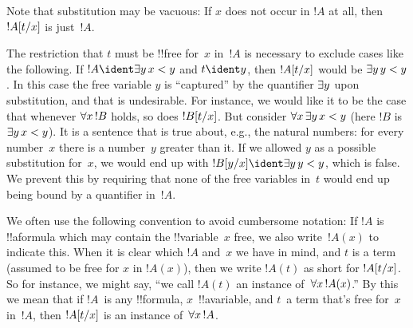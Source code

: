 \documentclass[../../../include/open-logic-section]{subfiles}
\begin{document}
\begin{explain}
Note that substitution may be vacuous: If $x$ does not occur in $!A$
at all, then $!A[t/x]$ is just~$!A$.

The restriction that $t$ must be !!{free for}~$x$ in~$!A$ is necessary to
exclude cases like the following. If $!A \ident \lexists[y][x < y]$
and $t \ident y$, then $!A[t/x]$ would be $\lexists[y][y <
  y]$. In this case the free variable $y$ is ``captured'' by the
quantifier $\lexists[y]$ upon substitution, and that is undesirable.
For instance, we would like it to be the case that whenever
$\lforall[x][!B]$ holds, so does $!B[t/x]$. But consider
$\lforall[x][\lexists[y][x < y]]$ (here $!B$ is $\lexists[y][x <
  y]$). It is a sentence that is true about, e.g., the natural numbers:
for every number~$x$ there is a number~$y$ greater than it. If we
allowed $y$ as a possible substitution for~$x$, we would end up with
$\Subst{!B}{y}{x} \ident \lexists[y][y < y]$, which is false. We
prevent this by requiring that none of the free variables in~$t$ would
end up being bound by a quantifier in~$!A$.
\end{explain}

We often use the following convention to avoid cumbersome notation: If
$!A$ is !!a{formula} which may contain the !!{variable}~$x$ free, we
also write~$!A(x)$ to indicate this. When it is clear which $!A$
and~$x$ we have in mind, and $t$ is a term (assumed to be free for $x$
in $!A(x)$), then we write $!A(t)$ as short for $!A[t/x]$. So
for instance, we might say, ``we call $!A(t)$ an instance
of~$\lforall[x][!A(x)]$.'' By this we mean that if $!A$~is any
!!{formula}, $x$~!!a{variable}, and $t$~a term that's free for~$x$
in~$!A$, then $!A[t/x]$ is an instance of~$\lforall[x][!A]$.
\end{document}

